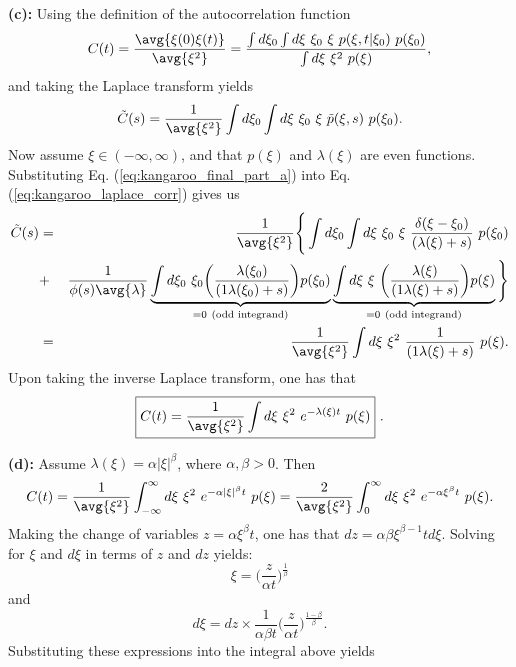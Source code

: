 \textbf{(c):} Using the definition of the autocorrelation function
\begin{equation}
C(t) = \frac{\avg{\xi(0) \xi(t)}}{\avg{\xi^2}} = \frac{\int d \xi_0 \int d \xi~\xi_0~\xi~p(\xi, t|\xi_0)~p(\xi_0)}{ \int d\xi~\xi^2~p(\xi)},
\end{equation}
and taking the Laplace transform yields
\begin{equation}
\tilde{C}(s) = \frac{1}{\avg{\xi^2}} \int d \xi_0 \int d \xi ~\xi_0~\xi~ \tilde{p}(\xi, s)~p(\xi_0). \label{eq:kangaroo_laplace_corr}
\end{equation}
Now assume $\xi \in (-\infty, \infty)$, and that $p(\xi)$ and $\lambda(\xi)$ are even functions. Substituting Eq. (\ref{eq:kangaroo_final_part_a}) into Eq. (\ref{eq:kangaroo_laplace_corr}) gives us
\begin{eqnarray}
\tilde{C}(s) &=& \frac{1}{\avg{\xi^2}} \Bigg\{\int d \xi_0 \int d \xi ~\xi_0~\xi~ \frac{\delta(\xi-\xi_0)}{(\lambda(\xi)+s)} ~p(\xi_0) \\
&+&\frac{1}{\phi(s) \avg{\lambda}}  \underbrace{\int d \xi_0~\xi_0 \bigg( \frac{\lambda(\xi_0) }{(1\lambda(\xi_0)+s)} \bigg) p(\xi_0)}_{=0~(\text{odd integrand})} \underbrace{\int d \xi ~\xi~ \bigg(\frac{\lambda(\xi)}{(1\lambda(\xi)+s)} \bigg) p(\xi)}_{=0~(\text{odd integrand})} \Bigg\} \\
&=& \frac{1}{\avg{\xi^2}} \int d \xi ~\xi^2~ \frac{1}{(1\lambda(\xi)+s)} ~p(\xi).
\end{eqnarray}
Upon taking the inverse Laplace transform, one has that
\begin{equation}
\boxed{C(t) = \frac{1}{\avg{\xi^2}} \int d \xi ~\xi^2~ e^{-\lambda(\xi) t } ~p(\xi)}~. \label{eq:kangaroo_final_part_c}
\end{equation}

\textbf{(d):} Assume $\lambda(\xi) = \alpha |\xi|^\beta$, where $\alpha, \beta>0$. Then
\begin{equation}
C(t) = \frac{1}{\avg{\xi^2}} \int_{-\infty}^{\infty} d \xi ~\xi^2~ e^{-\alpha |\xi|^\beta t}  ~p(\xi) = \frac{2}{\avg{\xi^2}} \int_{0}^{\infty} d \xi ~\xi^2~ e^{-\alpha \xi^\beta t}  ~p(\xi).
\end{equation}
Making the change of variables $z= \alpha \xi^\beta t$, one has that $dz = \alpha \beta \xi^{\beta-1} t d \xi$. Solving for $\xi$ and $d \xi$ in terms of $z$ and $dz$ yields:
\begin{equation}
\xi = \bigg( \frac{z}{\alpha t}\bigg)^\frac{1}{\beta}
\end{equation}
and
\begin{equation}
d\xi = dz \times \frac{1}{\alpha \beta t}\bigg( \frac{z}{\alpha t}\bigg)^\frac{1-\beta}{\beta}.
\end{equation}
Substituting these expressions into the integral above yields

